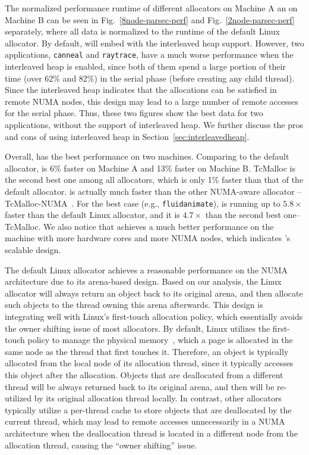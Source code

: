 The normalized performance runtime of different allocators on Machine A an on Machine B can be seen in Fig.~\ref{8node-parsec-perf} and Fig.~\ref{2node-parsec-perf} separately,  where all data is normalized to the runtime of the default Linux allocator. By default, \NM{} will embed with the interleaved heap support. However, two applications, \texttt{canneal} and \texttt{raytrace}, have  a much worse performance when the interleaved heap is enabled, since both of them spend a large portion of their time (over 62\% and 82\%) in the serial phase (before creating any child thread). Since the interleaved heap indicates that the allocations can be satisfied in remote NUMA nodes, this design may lead to a large number of remote accesses for the serial phase. Thus, these two figures show the best data for two applications, without the support of interleaved heap. We further discuss the pros and cons of using interleaved heap in Section~\ref{sec:interleavedheap}.  

Overall, \NM{} has the best performance on two machines. Comparing to the default allocator, \NM{} is 6\% faster on Machine A and 13\% faster on Machine B. TcMalloc is the second best one among all allocators, which is only 1\% faster than that of the default allocator. \NM{} is actually much faster than the other NUMA-aware allocator -- TcMalloc-NUMA~\cite{tcmallocnew}. For the best case (e.g., \texttt{fluidanimate}), \NM{} is running up to  $5.8\times$ faster than the default Linux allocator, and it is $4.7\times$ than the second best one--TcMalloc. We also notice that \NM{} achieves a much better performance on the machine with more hardware cores and more NUMA nodes, which indicates \NM{}'s scalable design. 

The default Linux allocator achieves a reasonable performance on the NUMA architecture due to its arena-based design. Based on our analysis, the Linux allocator will always return an object back to its original arena, and then allocate such objects to the thread owning this arena afterwards. This design is integrating well with Linux's first-touch allocation policy, which essentially avoids the owner shifting issue of most allocators. By default, Linux utilizes the first-touch policy to manage the physical memory~\cite{Lameter:2013:NO:2508834.2513149}, which a page is allocated in the same node as the thread that first touches it. Therefore, an object is typically allocated from the local node of its allocation thread, since it typically accesses this object after the allocation. Objects that are deallocated from a different thread will be always returned back to its original arena, and then will be re-utilized by its original allocation thread locally. In contrast, other allocators typically utilize a per-thread cache to store objects that are deallocated by the current thread, which may lead to remote accesses unnecessarily in a NUMA architecture when the deallocation thread is located in a different node from the allocation thread, causing the ``owner shifting'' issue.  

